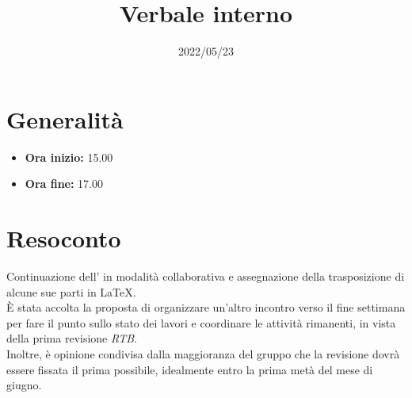 \documentclass{classes/base}
\title{Verbale interno}
\date{2022/05/23}
\author{\marcov}
\renewcommand{\maketitle}{
    
}
\begin{document}
    \maketitle

    \section*{Generalità}
    \begin{itemize}
        \item \textbf{Ora inizio:} 15.00
        \item \textbf{Ora fine:} 17.00
    \end{itemize}

    \section*{Resoconto}
    Continuazione dell'\AdR{} in modalità collaborativa e assegnazione della trasposizione di alcune sue parti in \LaTeX.\\
    È stata accolta la proposta di organizzare un'altro incontro verso il fine settimana per fare il punto sullo stato dei lavori e coordinare le attività rimanenti, in vista della prima revisione \textit{RTB}.\\
    Inoltre, è opinione condivisa dalla maggioranza del gruppo che la revisione dovrà essere fissata il prima possibile, idealmente entro la prima metà del mese di giugno.
\end{document}
